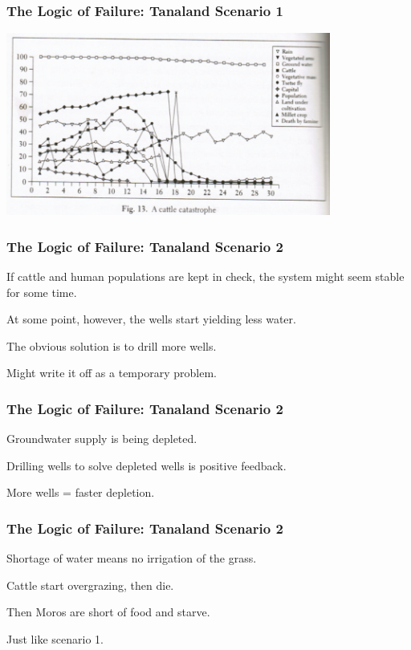 \begin{frame}
\frametitle{The Logic of Failure: Tanaland Scenario 1}
\begin{center}
	\includegraphics[width=0.8\textwidth]{images/cattlecatastrophe.png}
\end{center}
\end{frame}


\begin{frame}
\frametitle{The Logic of Failure: Tanaland Scenario 2}
\begin{changemargin}{1cm}

If cattle and human populations are kept in check, the system might seem stable for some time.

At some point, however, the wells start yielding less water.

 The obvious solution is to drill more wells.
 
 Might write it off as a temporary problem.
 
\end{changemargin}
\end{frame}

\begin{frame}
\frametitle{The Logic of Failure: Tanaland Scenario 2}
\begin{changemargin}{1cm}
Groundwater supply is being depleted.

Drilling wells to solve depleted wells is positive feedback.

More wells = faster depletion.


\end{changemargin}
\end{frame}

\begin{frame}
\frametitle{The Logic of Failure: Tanaland Scenario 2}
\begin{changemargin}{1cm}
Shortage of water means no irrigation of the grass.

Cattle start overgrazing, then die.

Then Moros are short of food and starve.

Just like scenario 1.

\end{changemargin}
\end{frame}

